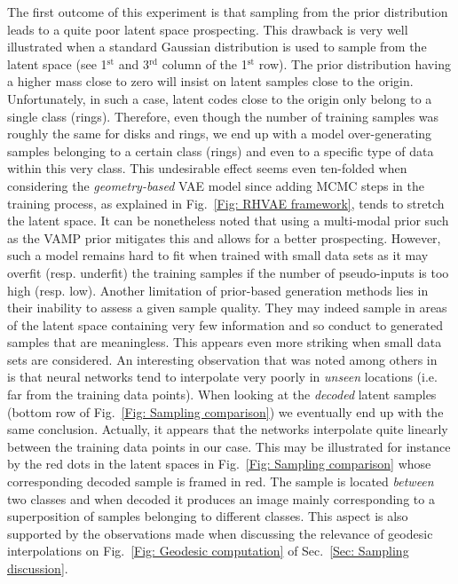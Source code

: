 \documentclass[10pt,journal,compsoc]{IEEEtran}
\begin{document}
        The first outcome of this experiment is that sampling from the prior distribution leads to a quite poor latent space prospecting. This drawback is very well illustrated when a standard Gaussian distribution is used to sample from the latent space (see 1$^{\mathrm{st}}$ and 3$^{\mathrm{rd}}$ column of the 1$^{\mathrm{st}}$ row). The prior distribution having a higher mass close to zero will insist on latent samples close to the origin. Unfortunately, in such a case, latent codes close to the origin only belong to a single class (rings). Therefore, even though the number of training samples was roughly the same for disks and rings, we end up with a model over-generating samples belonging to a certain class (rings) and even to a specific type of data within this very class. This undesirable effect seems even ten-folded when considering the \emph{geometry-based} VAE model since adding MCMC steps in the training process, as explained in Fig.~\ref{Fig: RHVAE framework}, tends to stretch the latent space. It can be nonetheless noted that using a multi-modal prior such as the VAMP prior mitigates this and allows for a better prospecting.
        However, such a model remains hard to fit when trained with small data sets as it may overfit (resp. underfit) the training samples if the number of pseudo-inputs is too high (resp. low). Another limitation of prior-based generation methods lies in their inability to assess a given sample quality. They may indeed sample in areas of the latent space containing very few information and so conduct to generated samples that are meaningless. This appears even more striking when small data sets are considered. An interesting observation that was noted among others in~\cite{arvanitidis_latent_2018} is that neural networks tend to interpolate very poorly in \textit{unseen} locations (i.e. far from the training data points). When looking at the \textit{decoded} latent samples (bottom row of Fig.~\ref{Fig: Sampling comparison}) we eventually end up with the same conclusion. Actually, it appears that the networks interpolate quite linearly between the training data points in our case. This may be illustrated for instance by the red dots in the latent spaces in Fig.~\ref{Fig: Sampling comparison} whose corresponding decoded sample is framed in red. The sample is located \emph{between} two classes and when decoded it produces an image mainly corresponding to a superposition of samples belonging to different classes. This aspect is also supported by the observations made when discussing the relevance of geodesic interpolations on Fig.~\ref{Fig: Geodesic computation} of Sec.~\ref{Sec: Sampling discussion}.
\end{document}
